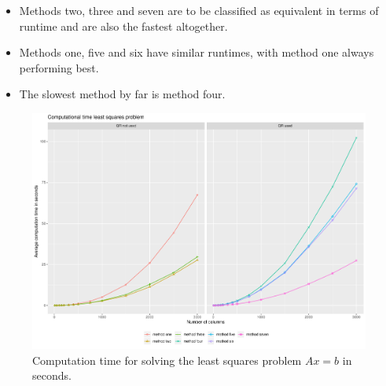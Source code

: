 \begin{itemize}
	\item Methods two, three and seven are to be classified as equivalent in terms of runtime and are also the fastest altogether.
	\item Methods one, five and six have similar runtimes, with method one always performing best.
	\item The slowest method by far is method four. 
\end{itemize}
\begin{figure}
	\centering
	\includegraphics[width=\textwidth]{figures/chapter_NNLS/computation_time}
	\caption{Computation time for solving the least squares problem $Ax = b$ in seconds.}
	\label{fig:comp_time}
\end{figure}



